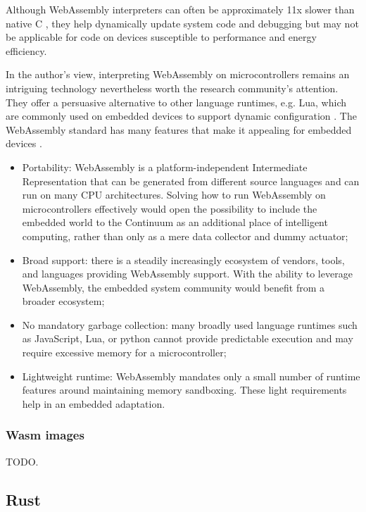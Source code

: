 Although WebAssembly interpreters can often be approximately 11x slower than native C \cite{wasm3-performance}, they help dynamically update system code and debugging but may not be applicable for code on devices susceptible to performance and energy efficiency.

In the author's view, interpreting WebAssembly on microcontrollers remains an intriguing technology nevertheless worth the research community's attention. They offer a persuasive alternative to other language runtimes, e.g. Lua, which are commonly used on embedded devices to support dynamic configuration \cite{brzoza2016embedded}. The WebAssembly standard has many features that make it appealing for embedded devices \cite{peach2020ewasm}.

\begin{itemize}
    \item Portability: WebAssembly is a platform-independent Intermediate Representation that can be generated from different source languages and can run on many CPU architectures. Solving how to run WebAssembly on microcontrollers effectively would open the possibility to include the embedded world to the Continuum as an additional place of intelligent computing, rather than only as a mere data collector and dummy actuator;
    \item Broad support: there is a steadily increasingly ecosystem of vendors, tools, and languages providing WebAssembly support. With the ability to leverage WebAssembly, the embedded system community would benefit from a broader ecosystem;
    \item No mandatory garbage collection: many broadly used language runtimes such as JavaScript, Lua, or python cannot provide predictable execution and may require excessive memory for a microcontroller;
    \item Lightweight runtime: WebAssembly mandates only a small number of runtime features around maintaining memory sandboxing. These light requirements help in an embedded adaptation.
\end{itemize}

\subsubsection{Wasm images}

TODO.

\subsection{Rust}
\label{sec:rust}

